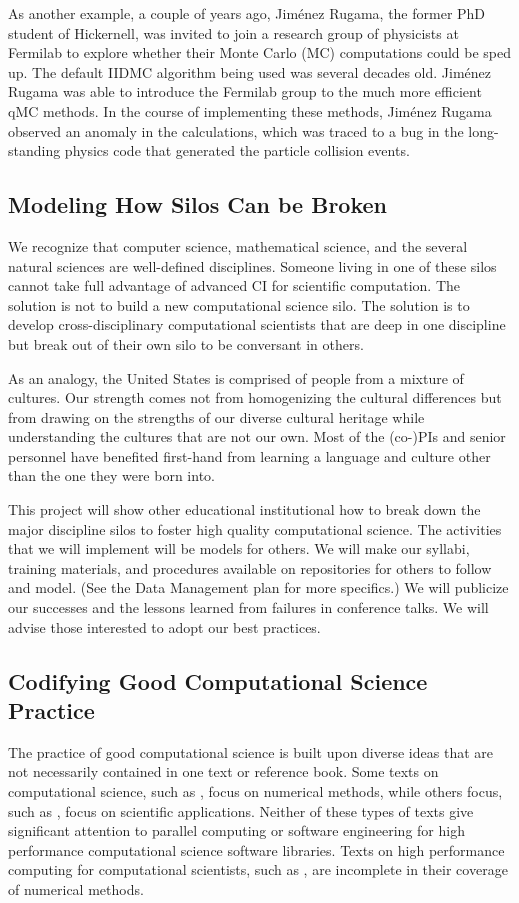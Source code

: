 \documentclass[11pt]{NSFamsart}
\begin{document}
As another example, a couple of years ago, Jim\'enez Rugama, the former PhD student of Hickernell, was invited to join a research group of physicists at Fermilab to explore whether their Monte Carlo (MC) computations could be sped up.  The default IIDMC algorithm being used was several decades old.  Jim\'enez Rugama was able to introduce the Fermilab group to the much more efficient qMC methods.  In the course of implementing these methods, Jim\'enez Rugama observed an anomaly in the calculations, which was traced to a bug in the long-standing physics code that generated the particle collision events.

\subsection{Modeling How Silos Can be Broken}
We recognize that computer science, mathematical science, and the several natural sciences are well-defined disciplines.  Someone living in one of these silos cannot take full advantage of advanced CI for scientific computation.  The solution is not to build a new computational science silo.  The solution is to develop cross-disciplinary computational scientists that are deep in one discipline but break out of their own silo to be conversant in others.

As an analogy, the United States is comprised of people from a mixture of cultures.  Our strength comes not from homogenizing the cultural differences but from drawing on the strengths of our diverse cultural heritage while understanding the cultures that are not our own.  Most of the (co-)PIs and senior personnel have benefited first-hand from learning a language and culture other than the one they were born into.

This project will show other educational institutional how to break down the major discipline silos to foster high quality computational science.  The activities that we will implement will be models for others.  We will make our syllabi, training materials, and procedures available on repositories for others to follow and model. (See the Data Management plan for more specifics.) We will publicize our successes and the lessons learned from failures in conference talks.  We will advise those interested to adopt our best practices.

\subsection{Codifying Good Computational Science Practice}
The practice of good computational science is built upon diverse ideas that are not necessarily contained in one text or reference book.  Some texts on computational science, such as \cite{TveEtal10a}, focus on numerical methods, while others focus, such as \cite{Thi13a}, focus on scientific applications.  Neither of these types of texts give significant attention to parallel computing or software engineering for high performance computational science software libraries. Texts on high performance computing for computational scientists, such as \cite{MagEtal16a}, are incomplete in their coverage of numerical methods.
\end{document}

